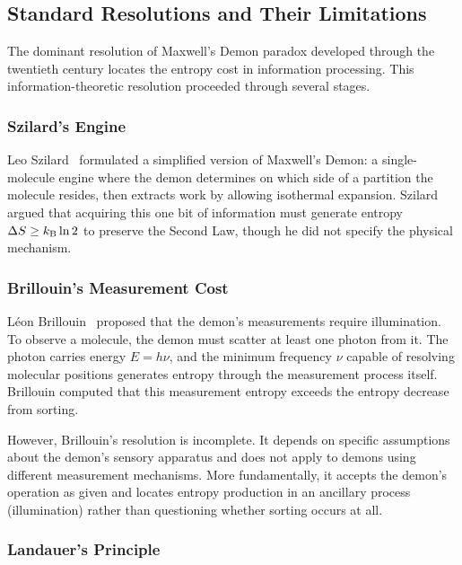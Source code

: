 \subsection{Standard Resolutions and Their Limitations}

The dominant resolution of Maxwell's Demon paradox developed through the twentieth century locates the entropy cost in information processing. This information-theoretic resolution proceeded through several stages.

\subsubsection{Szilard's Engine}

Leo Szilard~\cite{szilard1929entropieverminderung} formulated a simplified version of Maxwell's Demon: a single-molecule engine where the demon determines on which side of a partition the molecule resides, then extracts work by allowing isothermal expansion. Szilard argued that acquiring this one bit of information must generate entropy $\Delta S \geq k_{\mathrm{B}} \ln 2$ to preserve the Second Law, though he did not specify the physical mechanism.

\subsubsection{Brillouin's Measurement Cost}

Léon Brillouin~\cite{brillouin1951maxwells} proposed that the demon's measurements require illumination. To observe a molecule, the demon must scatter at least one photon from it. The photon carries energy $E = h\nu$, and the minimum frequency $\nu$ capable of resolving molecular positions generates entropy through the measurement process itself. Brillouin computed that this measurement entropy exceeds the entropy decrease from sorting.

However, Brillouin's resolution is incomplete. It depends on specific assumptions about the demon's sensory apparatus and does not apply to demons using different measurement mechanisms. More fundamentally, it accepts the demon's operation as given and locates entropy production in an ancillary process (illumination) rather than questioning whether sorting occurs at all.

\subsubsection{Landauer's Principle}

